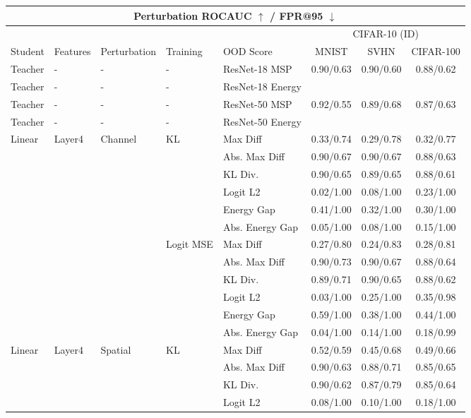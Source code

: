 \documentclass[border=2pt]{standalone}
\begin{document}
\setlength{\tabcolsep}{5pt}
\begin{tabular}{lllllccc}
\multicolumn{8}{c}{\textbf{Perturbation ROCAUC $\uparrow$ / FPR@95 $\downarrow$}}\\[4pt]
\toprule
 &  &  &  &  & \multicolumn{3}{c}{CIFAR-10 (ID)} \\
\cmidrule(lr){6-8}
Student & Features & Perturbation & Training & OOD Score & MNIST & SVHN & CIFAR-100 \\
\midrule
Teacher & - & - & - & ResNet-18 MSP & 0.90/0.63 & 0.90/0.60 & 0.88/0.62 \\
Teacher & - & - & - & ResNet-18 Energy &  &  &  \\
Teacher & - & - & - & ResNet-50 MSP & 0.92/0.55 & 0.89/0.68 & 0.87/0.63 \\
Teacher & - & - & - & ResNet-50 Energy &  &  &  \\
\midrule
Linear & Layer4 & Channel & KL & Max Diff & 0.33/0.74 & 0.29/0.78 & 0.32/0.77 \\
 &  &  &  & Abs. Max Diff & 0.90/0.67 & 0.90/0.67 & 0.88/0.63 \\
 &  &  &  & KL Div. & 0.90/0.65 & 0.89/0.65 & 0.88/0.61 \\
 &  &  &  & Logit L2 & 0.02/1.00 & 0.08/1.00 & 0.23/1.00 \\
 &  &  &  & Energy Gap & 0.41/1.00 & 0.32/1.00 & 0.30/1.00 \\
 &  &  &  & Abs. Energy Gap & 0.05/1.00 & 0.08/1.00 & 0.15/1.00 \\
\addlinespace
 &  &  & Logit MSE & Max Diff & 0.27/0.80 & 0.24/0.83 & 0.28/0.81 \\
 &  &  &  & Abs. Max Diff & 0.90/0.73 & 0.90/0.67 & 0.88/0.64 \\
 &  &  &  & KL Div. & 0.89/0.71 & 0.90/0.65 & 0.88/0.62 \\
 &  &  &  & Logit L2 & 0.03/1.00 & 0.25/1.00 & 0.35/0.98 \\
 &  &  &  & Energy Gap & 0.59/1.00 & 0.38/1.00 & 0.44/1.00 \\
 &  &  &  & Abs. Energy Gap & 0.04/1.00 & 0.14/1.00 & 0.18/0.99 \\
\midrule
Linear & Layer4 & Spatial & KL & Max Diff & 0.52/0.59 & 0.45/0.68 & 0.49/0.66 \\
 &  &  &  & Abs. Max Diff & 0.90/0.63 & 0.88/0.71 & 0.85/0.65 \\
 &  &  &  & KL Div. & 0.90/0.62 & 0.87/0.79 & 0.85/0.64 \\
 &  &  &  & Logit L2 & 0.08/1.00 & 0.10/1.00 & 0.18/1.00 \\

\end{tabular}
\end{document}
